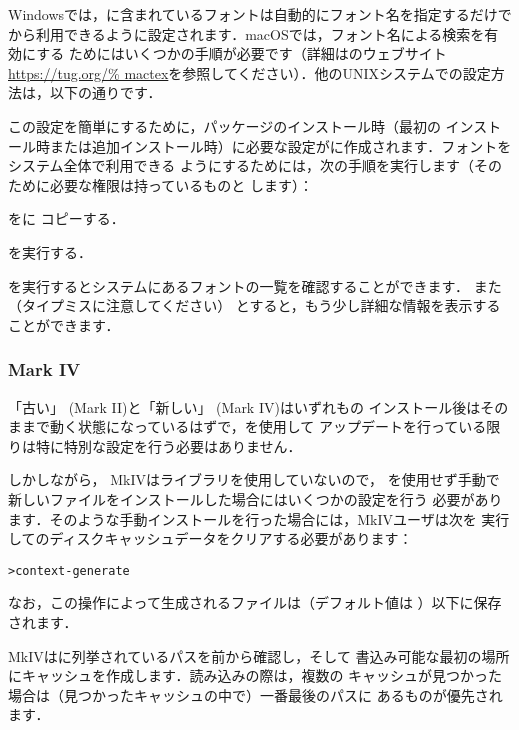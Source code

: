 \documentclass[uplatex,dvipdfmx,tombow]{jsarticle}
\begin{document}
Windowsでは，\TL に含まれているフォントは自動的にフォント名を指定するだけで\XeTeX
から利用できるように設定されます．macOSでは，フォント名による検索を有効にする
ためにはいくつかの手順が必要です（詳細は\MacTeX のウェブサイト\url{https://tug.org/%
mactex}を参照してください）．他のUNIXシステムでの設定方法は，以下の通りです．

この設定を簡単にするために，パッケージのインストール時（最初の\TL
インストール時または追加インストール時）に必要な設定がに作成されます．\TL フォントをシステム全体で利用できる
ようにするためには，次の手順を実行します（そのために必要な権限は持っているものと
します）：
%
\begin{enumerate*}
\item {}をに
  コピーする．
\item {}を実行する．
\end{enumerate*}

を実行するとシステムにあるフォントの一覧を確認することができます．
また（タイプミスに注意してください）
とすると，もう少し詳細な情報を表示することができます．

\subsubsection{{\ConTeXt} Mark IV}
\label{sec:context-mkiv}

「古い」{\ConTeXt} (Mark II)と「新しい」{\ConTeXt} (Mark IV)はいずれも\TL の
インストール後はそのままで動く状態になっているはずで，を使用して
アップデートを行っている限りは特に特別な設定を行う必要はありません．

しかしながら，{\ConTeXt} MkIVは\KPS ライブラリを使用していないので，%
を使用せず手動で新しいファイルをインストールした場合にはいくつかの設定を行う
必要があります．そのような手動インストールを行った場合には，MkIVユーザは次を
実行して\ConTeXt のディスクキャッシュデータをクリアする必要があります：
%
\begin{alltt}
> context -generate
\end{alltt}
%
なお，この操作によって生成されるファイルは（デフォルト値は
）以下に保存されます．

{\ConTeXt} MkIVはに列挙されているパスを前から確認し，そして
書込み可能な最初の場所にキャッシュを作成します．読み込みの際は，複数の
キャッシュが見つかった場合は（見つかったキャッシュの中で）一番最後のパスに
あるものが優先されます．
\end{document}
